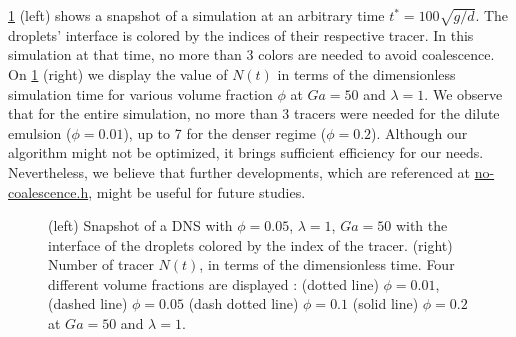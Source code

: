 \ref{fig:diagram} (left) shows a snapshot of a simulation at an arbitrary time $t^* = 100 \sqrt{g/d}$. 
The droplets' interface is colored by the indices of their respective tracer. 
In this simulation at that time, no more than 3 colors are needed to avoid coalescence.
On \ref{fig:diagram} (right) we display the value of $N(t)$ in terms of the dimensionless simulation time for various volume fraction $\phi$ at $Ga = 50$ and  $\lambda = 1$. 
We observe that for the entire simulation, no more than 3 tracers were needed for the dilute emulsion ($\phi = 0.01$), up to 7 for the denser regime ($\phi = 0.2$). 
Although our algorithm might not be optimized, it brings sufficient efficiency for our needs. 
Nevertheless, we believe that further developments, which are referenced at \href{http://basilisk.fr/sandbox/fintzin/Rising-Suspenion/no-coalescence.h}{no-coalescence.h}, might be useful for future studies.
\begin{figure}[h!]
    \centering
    \caption{
    (left) Snapshot of a DNS with $\phi = 0.05$, $\lambda = 1$, $Ga = 50$ with the interface of the droplets colored by the index of the tracer.
    (right) Number of tracer $N(t)$, in terms of the dimensionless time.
    Four different volume fractions are displayed : (dotted line) $\phi = 0.01$, (dashed line) $\phi = 0.05$ (dash dotted line) $\phi = 0.1$ (solid line) $\phi = 0.2$ at $Ga = 50$ and $\lambda = 1$. 
    }
    \label{fig:diagram}
\end{figure}


